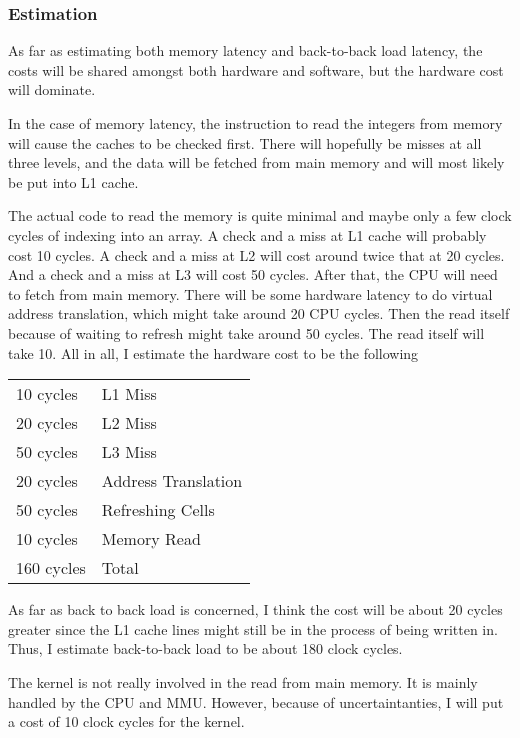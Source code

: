 \documentclass[paper=a4, fontsize=11pt]{scrartcl}
\numberwithin{equation}{section}        %
\numberwithin{figure}{section}          %
\numberwithin{table}{section}               %
\begin{document}
\subsubsection{Estimation}

As far as estimating both memory latency and back-to-back load latency, the costs will be shared amongst both hardware and software, but the hardware cost will dominate.

In the case of memory latency, the instruction to read the integers from memory will cause the caches to be checked first.  There will hopefully be misses at all three levels, and the data will be fetched from main memory and will most likely be put into L1 cache.

The actual code to read the memory is quite minimal and maybe only a few clock cycles of indexing into an array.  A check and a miss at L1 cache will probably cost 10 cycles.  A check and a miss at L2 will cost around twice that at 20 cycles.  And a check and a miss at L3 will cost 50 cycles.  After that, the CPU will need to fetch from main memory.  There will be some hardware latency to do virtual address translation, which might take around 20 CPU cycles.  Then the read itself because of waiting to refresh might take around 50 cycles.  The read itself will take 10.  All in all, I estimate the hardware cost to be the following

\begin{center}
\begin{tabular}{ l|l }
  10 cycles & L1 Miss \\
  20 cycles & L2 Miss \\
  50 cycles & L3 Miss \\
  20 cycles & Address Translation \\
  50 cycles & Refreshing Cells \\
  10 cycles & Memory Read \\
  \hline
  160 cycles & Total
\end{tabular}
\end{center}

As far as back to back load is concerned, I think the cost will be about 20 cycles greater since the L1 cache lines might still be in the process of being written in.  Thus, I estimate back-to-back load to be about 180 clock cycles.

The kernel is not really involved in the read from main memory.  It is mainly handled by the CPU and MMU.  However, because of uncertaintanties, I will put a cost of 10 clock cycles for the kernel.
\end{document}
